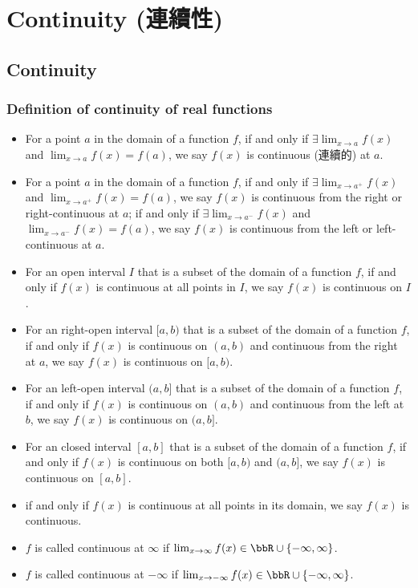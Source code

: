 \documentclass[a4paper,12pt]{report}
\begin{document}
\section{Continuity (連續性)}
\subsection{Continuity}
\subsubsection{Definition of continuity of real functions}
\begin{itemize}
\item For a point $a$ in the domain of a function $f$, if and only if $\exists\lim_{x\to a}f(x)$ and $\lim_{x\to a}f(x)=f(a)$, we say $f(x)$ is continuous (連續的) at $a$.
\item For a point $a$ in the domain of a function $f$, if and only if $\exists\lim_{x\to a^+}f(x)$ and $\lim_{x\to a^+}f(x)=f(a)$, we say $f(x)$ is continuous from the right or right-continuous at $a$; if and only if $\exists \lim_{x\to a^-} f(x)$ and $\lim_{x\to a^-} f(x)=f(a)$, we say $f(x)$ is continuous from the left or left-continuous at $a$.
\item For an open interval $I$ that is a subset of the domain of a function $f$, if and only if $f(x)$ is continuous at all points in $I$, we say $f(x)$ is continuous on $I$.
\item For an right-open interval $[a,b)$ that is a subset of the domain of a function $f$, if and only if $f(x)$ is continuous on $(a,b)$ and continuous from the right at $a$, we say $f(x)$ is continuous on $[a,b)$.
\item For an left-open interval $(a,b]$ that is a subset of the domain of a function $f$, if and only if $f(x)$ is continuous on $(a,b)$ and continuous from the left at $b$, we say $f(x)$ is continuous on $(a,b]$.
\item For an closed interval $[a,b]$ that is a subset of the domain of a function $f$, if and only if $f(x)$ is continuous on both $[a,b)$ and $(a,b]$, we say $f(x)$ is continuous on $[a,b]$.
\item if and only if $f(x)$ is continuous at all points in its domain, we say $f(x)$ is continuous.
\item $f$ is called continuous at $\infty$ if $\lim_{x\to\infty}f(x)\in\bbR\cup\{-\infty,\infty\}$.
\item $f$ is called continuous at $-\infty$ if $\lim_{x\to-\infty}f(x)\in\bbR\cup\{-\infty,\infty\}$.
\eit

\end{itemize}
\end{document}
